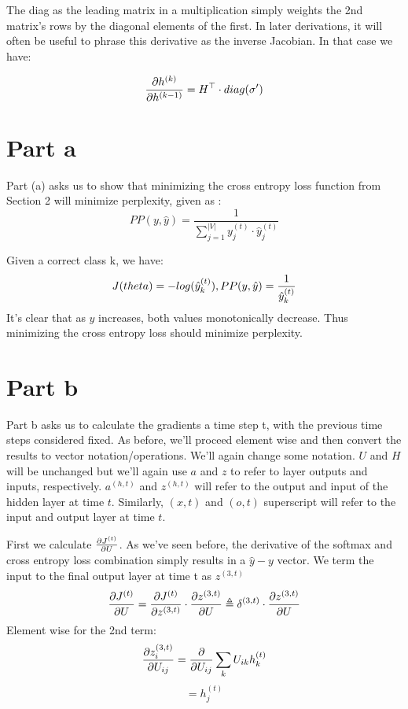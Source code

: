 \documentclass[]{article}
\newcommand{\deriv}[2]{%
	\ensuremath{\frac{\partial {#1}}{\partial {#2}}}}
\newcommand{\slayer}[3]{ %
	\ensuremath{{#1}^{(#2)}_{#3}}}
\newcommand{\vlayer}[2]{ %
	\ensuremath{{#1}^{(#2)}}}
\begin{document}
The diag as the leading matrix in a multiplication simply weights the 2nd matrix's rows by the diagonal elements of the first. In later derivations, it will often be useful to phrase this derivative as the inverse Jacobian. In that case we have:

$$\deriv{\vlayer{h}{k}}{\vlayer{h}{k-1}} = H^\top \cdot diag(\sigma')$$

\section{Part a}
Part (a) asks us to show that minimizing the cross entropy loss function from Section 2 will minimize perplexity, given as :
$$ PP(y, \hat{y}) = \frac{1}{\sum_{j=1}^{|V|}\slayer{y}{t}{j}\cdot\slayer{\hat{y}}{t}{j}}$$

Given a correct class k, we have:
$$J(theta) = -log(\slayer{\hat{y}}{t}{k}) , PP(y, \hat{y}) = \frac{1}{\slayer{\hat{y}}{t}{k}} $$
It's clear that as $\hat{y}$ increases, both values monotonically decrease. Thus minimizing the cross entropy loss should minimize perplexity. 

\section{Part b}
Part b asks us to calculate the gradients a time step t, with the previous time steps considered fixed. As before, we'll proceed element wise and then convert the results to vector notation/operations. We'll again change some notation. $U$ and $H$ will be unchanged but we'll again use $a$ and $z$ to refer to layer outputs and inputs, respectively.\vlayer{a}{h,t} and\vlayer{z}{h,t} will refer to the output and input of the hidden layer at time $t$. Similarly, $(x,t)$ and $(o,t)$ superscript will refer to the input and output layer at time $t$.

First we calculate $\deriv{\vlayer{J}{t}}{U}$. As we've seen before, the derivative of the softmax and cross entropy loss combination simply results in a $\hat{y} - y$ vector. We term the input to the final output layer at time t as\vlayer{z}{3,t}
$$\deriv{\vlayer{J}{t}}{U} = \deriv{\vlayer{J}{t}}{\vlayer{z}{3,t}}\cdot\deriv{\vlayer{z}{3,t}}{U} \triangleq\vlayer{\delta}{3,t}\cdot\deriv{\vlayer{z}{3,t}}{U}$$
Element wise for the 2nd term:
$$ \deriv{\slayer{z}{3,t}{i}}{U_{ij}} = \deriv{}{U_{ij}} \sum_{k} U_{ik}\slayer{h}{t}{k}$$
$$ = \slayer{h}{t}{j}$$
\end{document}
